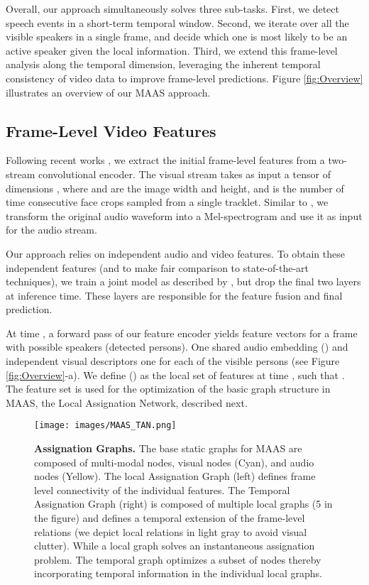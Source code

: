 \documentclass[10pt,twocolumn,letterpaper]{article}
\begin{document}
Overall, our approach simultaneously solves three sub-tasks. First, we detect speech events in a short-term temporal window. Second, we iterate over all the visible speakers in a single frame, and decide which one is most likely to be an active speaker given the local information. Third, we extend this frame-level analysis along the temporal dimension, leveraging the inherent temporal consistency of video data to improve frame-level predictions. Figure \ref{fig:Overview} illustrates an overview of our MAAS approach.


\subsection{Frame-Level Video Features}
\label{subsec:Features}


Following recent works \cite{roth2019ava, zhangmulti}, we extract the initial frame-level features from a two-stream convolutional encoder. The visual stream takes as input a tensor of dimensions , where  and  are the image width and height, and  is the number of time consecutive face crops sampled from a single tracklet. Similar to \cite{roth2019ava}, we transform the original audio waveform into a Mel-spectrogram and use it as input for the audio stream. 

Our approach relies on independent audio and video features. To obtain these independent features (and to make fair comparison to state-of-the-art techniques), we train a joint model as described by \cite{roth2019ava}, but drop the final two layers at inference time. These layers are responsible for the feature fusion and final prediction. 

At time , a forward pass of our feature encoder yields  feature vectors for a frame with  possible speakers (detected persons). One shared audio embedding () and  independent visual descriptors  one for each of the  visible persons (see Figure \ref{fig:Overview}-a). We define () as the local set of features at time , such that . The feature set  is used for the optimization of the basic graph structure in MAAS, the Local Assignation Network, described next.

\begin{figure*}[t!]
    \begin{center}
        \texttt{[image: images/MAAS\_TAN.png]}
    \end{center}
    \caption{\textbf{Assignation Graphs.} The base static graphs for MAAS are composed of multi-modal nodes, visual nodes (Cyan), and audio nodes  (Yellow). The local Assignation Graph (left) defines frame level connectivity of the individual features. The Temporal Assignation Graph (right) is composed of multiple local graphs (5 in the figure) and defines a temporal extension of the frame-level relations (we depict local relations in light gray to avoid visual clutter). While a local graph solves an instantaneous assignation problem.  The temporal graph optimizes a subset of nodes thereby incorporating temporal information in the individual local graphs.
    }
    \label{fig:tempralgraph}
\end{figure*}
 
\end{document}

